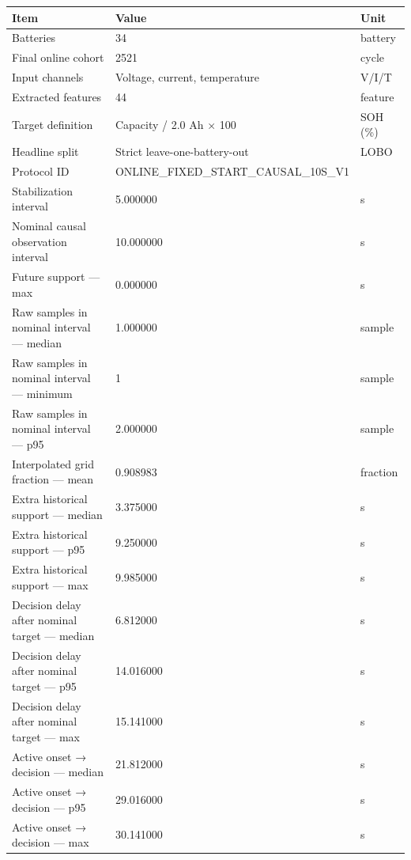 \begin{tabular}{lll}
\toprule
Item & Value & Unit \\
\midrule
Batteries & 34 & battery \\
Final online cohort & 2521 & cycle \\
Input channels & Voltage, current, temperature & V/I/T \\
Extracted features & 44 & feature \\
Target definition & Capacity / 2.0 Ah × 100 & SOH (\%) \\
Headline split & Strict leave-one-battery-out & LOBO \\
Protocol ID & ONLINE\_FIXED\_START\_CAUSAL\_10S\_V1 &  \\
Stabilization interval & 5.000000 & s \\
Nominal causal observation interval & 10.000000 & s \\
Future support — max & 0.000000 & s \\
Raw samples in nominal interval — median & 1.000000 & sample \\
Raw samples in nominal interval — minimum & 1 & sample \\
Raw samples in nominal interval — p95 & 2.000000 & sample \\
Interpolated grid fraction — mean & 0.908983 & fraction \\
Extra historical support — median & 3.375000 & s \\
Extra historical support — p95 & 9.250000 & s \\
Extra historical support — max & 9.985000 & s \\
Decision delay after nominal target — median & 6.812000 & s \\
Decision delay after nominal target — p95 & 14.016000 & s \\
Decision delay after nominal target — max & 15.141000 & s \\
Active onset → decision — median & 21.812000 & s \\
Active onset → decision — p95 & 29.016000 & s \\
Active onset → decision — max & 30.141000 & s \\
\bottomrule
\end{tabular}
